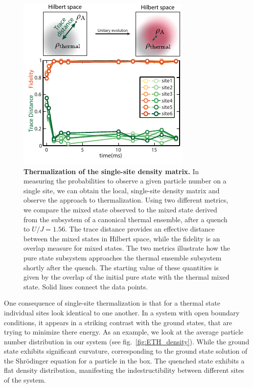 \begin{figure}[t!]
	\centering
	\includegraphics[scale=1.5]{figures/ETH_fidelity.pdf}
	\caption{{\bf Thermalization of the single-site density matrix.} In measuring the probabilities to observe a given particle number on a single site, we can obtain the local, single-site density matrix and observe the approach to thermalization. Using two different metrics, we compare the mixed state observed to the mixed state derived from the subsystem of a canonical thermal ensemble, after a quench to $U/J=1.56$. The trace distance provides an effective distance between the mixed states in Hilbert space, while the fidelity is an overlap measure for mixed states. The two metrics illustrate how the pure state subsystem approaches the thermal ensemble subsystem shortly after the quench. The starting value of these quantities is given by the overlap of the initial pure state with the thermal mixed state. Solid lines connect the data points.}
	\label{fig:ETH_Rho}
\end{figure} 

One consequence of single-site thermalization is that for a thermal state individual sites look identical to one another. In a system with open boundary conditions, it appears in a striking contrast with the ground states, that are trying to minimize there energy. As an example, we look at the average particle number distribution in our system (see fig.~\ref{fig:ETH_density}). While the ground state exhibits significant curvature, corresponding to the ground state solution of the Shr\"odinger equation for a particle in the box. The quenched state exhibits a flat density distribution, manifesting the indestructibility between different sites of the system.

